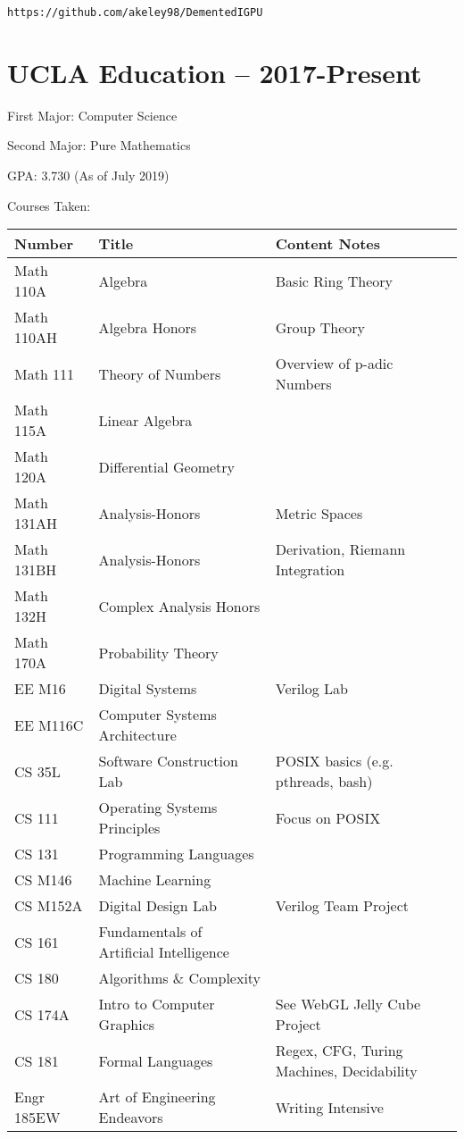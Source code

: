\documentclass[11pt]{article}
\begin{document}
\texttt{https://github.com/akeley98/DementedIGPU}

\section{UCLA Education -- 2017-Present}

First Major: Computer Science

Second Major: Pure Mathematics

GPA: 3.730 (As of July 2019)

Courses Taken:

\begin{tabular}{l|l|l}
Number & Title & Content Notes \\
\hline
Math 110A & Algebra & Basic Ring Theory \\
Math 110AH & Algebra Honors & Group Theory \\
Math 111 & Theory of Numbers & Overview of p-adic Numbers \\
Math 115A & Linear Algebra & \\
Math 120A & Differential Geometry & \\
Math 131AH & Analysis-Honors & Metric Spaces \\
Math 131BH & Analysis-Honors & Derivation, Riemann Integration \\
Math 132H & Complex Analysis Honors & \\
Math 170A & Probability Theory & \\
EE M16 & Digital Systems & Verilog Lab \\
EE M116C & Computer Systems Architecture & \\
CS 35L & Software Construction Lab & POSIX basics (e.g. pthreads, bash) \\
CS 111 & Operating Systems Principles & Focus on POSIX \\
CS 131 & Programming Languages & \\
CS M146 & Machine Learning & \\
CS M152A & Digital Design Lab & Verilog Team Project \\
CS 161 & Fundamentals of Artificial Intelligence & \\
CS 180 & Algorithms \& Complexity & \\
CS 174A & Intro to Computer Graphics & See WebGL Jelly Cube Project \\
CS 181 & Formal Languages\footnotemark & Regex, CFG, Turing Machines, Decidability \\
Engr 185EW & Art of Engineering Endeavors & Writing Intensive
\end{tabular}
\end{document}
